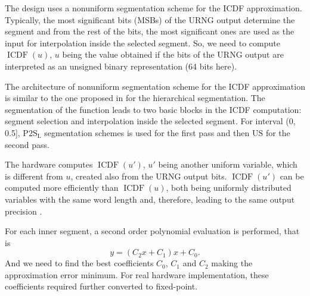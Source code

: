 \documentclass[a4paper, titlepage]{article}
\DeclareMathOperator{\ICDF}{ICDF}
\begin{document}
The design uses a nonuniform segmentation scheme
for the ICDF approximation.
Typically, the most significant bits (MSBs) of the URNG output
determine the segment and from the rest of the bits,
the most significant ones are used as the input for
interpolation inside the selected segment.
So, we need to compute $\ICDF(u)$, $u$ being the value obtained
if the bits of the URNG output are interpreted as
an unsigned binary representation (64 bits here).

The architecture of nonuniform segmentation scheme for
the ICDF approximation is similar to the one proposed in \cite{cheung} for
the hierarchical segmentation.
The segmentation of the function leads to two basic blocks in
the ICDF computation: segment selection and
interpolation inside the selected segment.
For interval (0, 0.5], $\mathrm{P2S_L}$ segmentation schemes is used for
the first pass and then $\mathrm{US}$ for the second pass.

The hardware computes $\ICDF(u')$, $u'$ being another uniform variable,
which is different from $u$, created also from the URNG output bits.
$\ICDF(u')$ can be computed more efficiently than $\ICDF(u)$,
both being uniformly distributed variables with the same word length and,
therefore, leading to the same output precision \cite{gutierrez}.

For each inner segment, a second order polynomial evaluation is performed,
that is
\begin{equation}
    y = (C_2x + C_1)x + C_0.
\end{equation}
And we need to find the best coefficients $C_0$, $C_1$ and $C_2$
making the approximation error minimum.
For real hardware implementation, these coefficients required
further converted to fixed-point.
\end{document}
